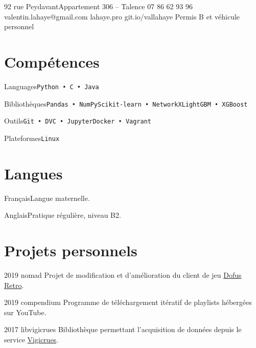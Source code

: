 \documentclass{tccv}
\begin{document}
\personal
    {92 rue Peydavant\newline Appartement 306 -- Talence}
    {07 86 62 93 96}
    {valentin.lahaye@gmail.com}
    {lahaye.pro}
    {git.io/vallahaye}
    {Permis B et véhicule personnel}

\section{Compétences}
\begin{factlist}

\item{Languages}{\texttt{Python • C • Java}}

\item{Bibliothèques}{\texttt{Pandas • NumPy}\newline\texttt{Scikit-learn • NetworkX}\newline\texttt{LightGBM • XGBoost}}

\item{Outils}{\texttt{Git • DVC • Jupyter}\newline\texttt{Docker • Vagrant}}

\item{Plateformes}{\texttt{Linux}}

\end{factlist}

\section{Langues}
\begin{factlist}

\item{Français}{Langue maternelle.}

\item{Anglais}{Pratique régulière, niveau B2.}

\end{factlist}

\section{Projets personnels}
\begin{yearlist}

\item{2019}
    {nomad \href{https://gitlab.com/emurub/nomad}{\scriptsize\faExternalLink}}
    {Projet de modification et d'amélioration du client de jeu
    \href{https://www.dofus.com/fr/plus-dofus/dofus-retro}{Dofus Retro}.}

\item{2019}
    {compendium \href{https://github.com/vallahaye/compendium}{\scriptsize\faExternalLink}}
    {Programme de téléchargement itératif de playlists hébergées sur YouTube.}

\item{2017}
    {libvigicrues \href{https://github.com/vallahaye/libvigicrues}{\scriptsize\faExternalLink}}
    {Bibliothèque permettant l'acquisition de données depuis le service
    \href{https://www.vigicrues.gouv.fr}{Vigicrues}.}

\end{yearlist}
\end{document}
